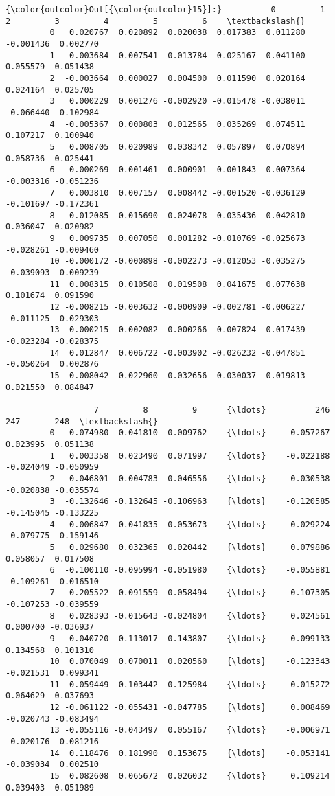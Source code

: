 \documentclass[11pt]{article}
\begin{document}
\begin{Verbatim}[commandchars=\\\{\}]
{\color{outcolor}Out[{\color{outcolor}15}]:}          0         1         2         3         4         5         6    \textbackslash{}
         0   0.020767  0.020892  0.020038  0.017383  0.011280 -0.001436  0.002770   
         1   0.003684  0.007541  0.013784  0.025167  0.041100  0.055579  0.051438   
         2  -0.003664  0.000027  0.004500  0.011590  0.020164  0.024164  0.025705   
         3   0.000229  0.001276 -0.002920 -0.015478 -0.038011 -0.066440 -0.102984   
         4  -0.005367  0.000803  0.012565  0.035269  0.074511  0.107217  0.100940   
         5   0.008705  0.020989  0.038342  0.057897  0.070894  0.058736  0.025441   
         6  -0.000269 -0.001461 -0.000901  0.001843  0.007364 -0.003316 -0.051236   
         7   0.003810  0.007157  0.008442 -0.001520 -0.036129 -0.101697 -0.172361   
         8   0.012085  0.015690  0.024078  0.035436  0.042810  0.036047  0.020982   
         9   0.009735  0.007050  0.001282 -0.010769 -0.025673 -0.028261 -0.009460   
         10 -0.000172 -0.000898 -0.002273 -0.012053 -0.035275 -0.039093 -0.009239   
         11  0.008315  0.010508  0.019508  0.041675  0.077638  0.101674  0.091590   
         12 -0.008215 -0.003632 -0.000909 -0.002781 -0.006227 -0.011125 -0.029303   
         13  0.000215  0.002082 -0.000266 -0.007824 -0.017439 -0.023284 -0.028375   
         14  0.012847  0.006722 -0.003902 -0.026232 -0.047851 -0.050264  0.002876   
         15  0.008042  0.022960  0.032656  0.030037  0.019813  0.021550  0.084847   
         
                  7         8         9      {\ldots}          246       247       248  \textbackslash{}
         0   0.074980  0.041810 -0.009762    {\ldots}    -0.057267  0.023995  0.051138   
         1   0.003358  0.023490  0.071997    {\ldots}    -0.022188 -0.024049 -0.050959   
         2   0.046801 -0.004783 -0.046556    {\ldots}    -0.030538 -0.020838 -0.035574   
         3  -0.132646 -0.132645 -0.106963    {\ldots}    -0.120585 -0.145045 -0.133225   
         4   0.006847 -0.041835 -0.053673    {\ldots}     0.029224 -0.079775 -0.159146   
         5   0.029680  0.032365  0.020442    {\ldots}     0.079886  0.058057  0.017508   
         6  -0.100110 -0.095994 -0.051980    {\ldots}    -0.055881 -0.109261 -0.016510   
         7  -0.205522 -0.091559  0.058494    {\ldots}    -0.107305 -0.107253 -0.039559   
         8   0.028393 -0.015643 -0.024804    {\ldots}     0.024561  0.000700 -0.036937   
         9   0.040720  0.113017  0.143807    {\ldots}     0.099133  0.134568  0.101310   
         10  0.070049  0.070011  0.020560    {\ldots}    -0.123343 -0.021531  0.099341   
         11  0.059449  0.103442  0.125984    {\ldots}     0.015272  0.064629  0.037693   
         12 -0.061122 -0.055431 -0.047785    {\ldots}     0.008469 -0.020743 -0.083494   
         13 -0.055116 -0.043497  0.055167    {\ldots}    -0.006971 -0.020176 -0.081216   
         14  0.118476  0.181990  0.153675    {\ldots}    -0.053141 -0.039034  0.002510   
         15  0.082608  0.065672  0.026032    {\ldots}     0.109214  0.039403 -0.051989   
         

\end{Verbatim}
\end{document}
